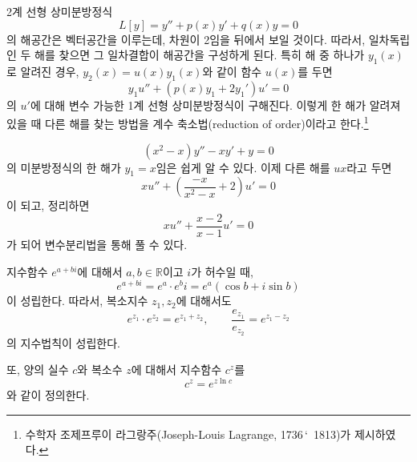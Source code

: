 \documentclass[../engineering_mathematics_lecture_note.tex]{subfiles}
\begin{document}
2계 선형 상미분방정식
\begin{equation*}
    L[y] = y'' + p(x) y' + q(x) y = 0
\end{equation*}
의 해공간은 벡터공간을 이루는데, 차원이 2임을 뒤에서 보일 것이다.
따라서, 일차독립인 두 해를 찾으면 그 일차결합이 해공간을 구성하게 된다.
특히 해 중 하나가 $y_1(x)$로 알려진 경우, $y_2(x) = u(x)y_1(x)$와 같이 함수 $u(x)$를 두면
\begin{equation*}
    y_1 u'' + \left( p(x) y_1 + 2y_1' \right) u' = 0
\end{equation*}
의 $u'$에 대해 변수 가능한 1계 선형 상미분방정식이 구해진다.
이렇게 한 해가 알려져 있을 때 다른 해를 찾는 방법을 계수 축소법(reduction of order)이라고 한다.\footnote{수학자 조제프루이 라그랑주(Joseph-Louis Lagrange, 1736\,\char`~1813)가 제시하였다.}

\begin{example}
    \begin{equation*}
        (x^2 - x) y'' - xy' + y = 0
    \end{equation*}
    의 미분방정식의 한 해가 $y_1 = x$임은 쉽게 알 수 있다.
    이제 다른 해를 $ux$라고 두면
    \begin{equation*}
        xu'' + \left( \frac{-x}{x^2 - x} + 2 \right) u' = 0
    \end{equation*}
    이 되고, 정리하면
    \begin{equation*}
        xu'' + \frac{x - 2}{x - 1} u' = 0
    \end{equation*}
    가 되어 변수분리법을 통해 풀 수 있다.
\end{example}

\begin{remark}
    지수함수 $e^{a + bi}$에 대해서 $a, b \in \mathbb R$이고 $i$가 허수일 때,
    \begin{equation*}
        e^{a + bi} = e^a \cdot e^bi = e^a (\cos b + i \sin b)
    \end{equation*}
    이 성립한다.
    따라서, 복소지수 $z_1, z_2$에 대해서도
    \begin{equation*}
        e^{z_1} \cdot e^{z_2} = e^{z_1 + z_2}, \qquad \frac{e_{z_1}}{e_{z_2}} = e^{z_1 - z_2}
    \end{equation*}
    의 지수법칙이 성립한다.

    또, 양의 실수 $c$와 복소수 $z$에 대해서 지수함수 $c^z$를
    \begin{equation*}
        c^z = e^{z \ln c}
    \end{equation*}
    와 같이 정의한다.
\end{remark}
\end{document}
